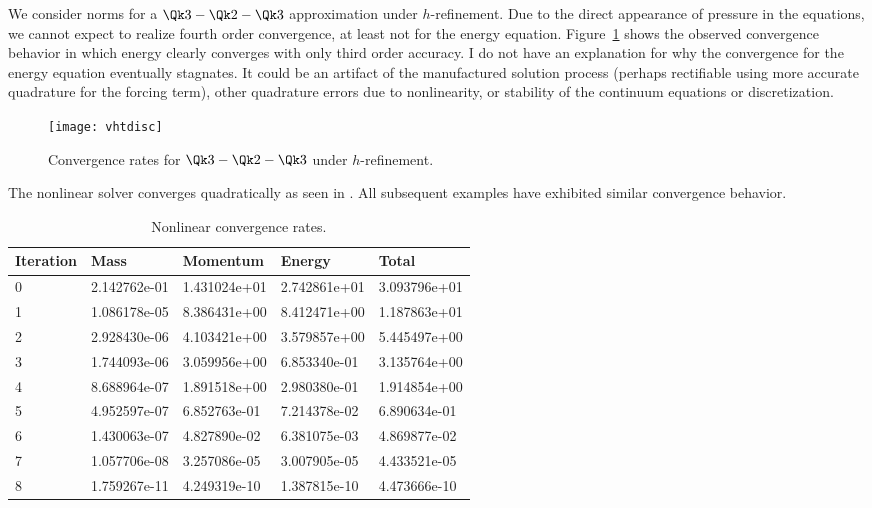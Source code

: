 We consider norms for a $\Qk 3 - \Qk 2 - \Qk 3$ approximation under $h$-refinement.
Due to the direct appearance of pressure in the equations, we cannot expect to realize fourth order convergence, at least not for the energy equation.
Figure~\ref{fig:vhtrefine} shows the observed convergence behavior in which energy clearly converges with only third order accuracy.
I do not have an explanation for why the convergence for the energy equation eventually stagnates.
It could be an artifact of the manufactured solution process (perhaps rectifiable using more accurate quadrature for the forcing term), other quadrature errors due to nonlinearity, or stability of the continuum equations or discretization.

\begin{figure}
  \centering\texttt{[image: vhtdisc]}
  \caption{Convergence rates for $\Qk 3 - \Qk 2 - \Qk 3$ under $h$-refinement.}\label{fig:vhtrefine}
\end{figure}

The nonlinear solver converges quadratically as seen in .
All subsequent examples have exhibited similar convergence behavior.
\begin{table}
  \centering
  \begin{tabular}{lllll}
    \toprule
    Iteration & Mass         & Momentum     & Energy       & Total        \\
    \midrule
    0         & 2.142762e-01 & 1.431024e+01 & 2.742861e+01 & 3.093796e+01 \\
    1         & 1.086178e-05 & 8.386431e+00 & 8.412471e+00 & 1.187863e+01 \\
    2         & 2.928430e-06 & 4.103421e+00 & 3.579857e+00 & 5.445497e+00 \\
    3         & 1.744093e-06 & 3.059956e+00 & 6.853340e-01 & 3.135764e+00 \\
    4         & 8.688964e-07 & 1.891518e+00 & 2.980380e-01 & 1.914854e+00 \\
    5         & 4.952597e-07 & 6.852763e-01 & 7.214378e-02 & 6.890634e-01 \\
    6         & 1.430063e-07 & 4.827890e-02 & 6.381075e-03 & 4.869877e-02 \\
    7         & 1.057706e-08 & 3.257086e-05 & 3.007905e-05 & 4.433521e-05 \\
    8         & 1.759267e-11 & 4.249319e-10 & 1.387815e-10 & 4.473666e-10 \\
    \bottomrule
  \end{tabular}
  \caption{Nonlinear convergence rates.}\label{tab:vhtsnes}
\end{table}


